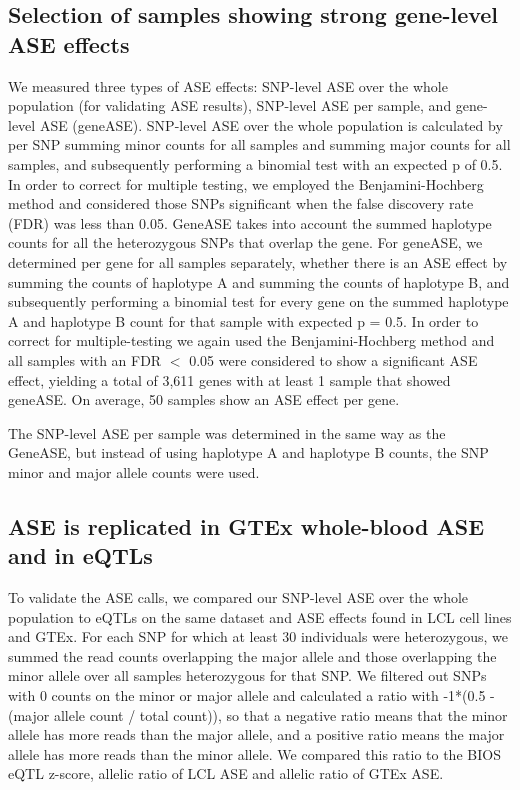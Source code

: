 \subsection{Selection of samples showing strong gene-level ASE effects}
We measured three types of ASE effects: SNP-level ASE over the whole population (for validating ASE results), SNP-level ASE per sample, and gene-level ASE (geneASE). SNP-level ASE over the whole population is calculated by per SNP summing minor counts for all samples and summing major counts for all samples, and subsequently performing a binomial test with an expected p of 0.5. In order to correct for multiple testing, we employed the Benjamini-Hochberg method and considered those SNPs significant when the false discovery rate (FDR) was less than 0.05. GeneASE takes into account the summed haplotype counts for all the heterozygous SNPs that overlap the gene. For geneASE, we determined per gene for all samples separately, whether there is an ASE effect by summing the counts of haplotype A and summing the counts of haplotype B, and subsequently performing a binomial test for every gene on the summed haplotype A and haplotype B count for that sample with expected p = 0.5. In order to correct for multiple-testing we again used the Benjamini-Hochberg method and all samples with an FDR $<$ 0.05 were considered to show a significant ASE effect, yielding a total of 3,611 genes with at least 1 sample that showed geneASE. On average, 50 samples show an ASE effect per gene.

The SNP-level ASE per sample was determined in the same way as the GeneASE, but instead of using haplotype A and haplotype B counts, the SNP minor and major allele counts were used.

\subsection{ASE is replicated in GTEx whole-blood ASE and in eQTLs}
To validate the ASE calls, we compared our SNP-level ASE over the whole population to eQTLs on the same dataset and ASE effects found in LCL cell lines\cite{deelenCallingGenotypesPublic2015} and GTEx\cite{pirinenAssessingAllelespecificExpression2015}. For each SNP for which at least 30 individuals were heterozygous, we summed the read counts overlapping the major allele and those overlapping the minor allele over all samples heterozygous for that SNP. We filtered out SNPs with 0 counts on the minor or major allele and calculated a ratio with -1*(0.5 - (major allele count / total count)), so that a negative ratio means that the minor allele has more reads than the major allele, and a positive ratio means the major allele has more reads than the minor allele. We compared this ratio to the BIOS eQTL z-score, allelic ratio of LCL ASE and allelic ratio of GTEx ASE. 

